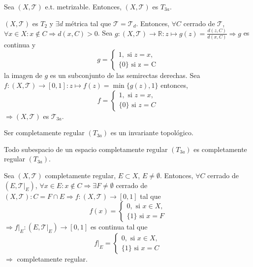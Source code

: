 \begin{prop}
  Sea $( X, \mathcal{T} )$ e.t. metrizable. Entonces, $( X, \mathcal{T} )$ es $T_{3a}$.
\end{prop}

\begin{dem}
  $( X, \mathcal{T} )$ es $T_{2}$ y $\exists d$ métrica tal que $\mathcal{T} = \mathcal{T}_{d}$. Entonces, $\forall C $ cerrado de $\mathcal{T}$, $\forall x \in X: x \not \in C \Rightarrow d(x, C) > 0$. Sea $g: ( X, \mathcal{T} ) \to \mathbb{R}: z \mapsto g(z) = \frac{d(z, C)}{d(x, C)} \Rightarrow g$ es continua y
  \[ 
    g =
    \begin{cases}
      1, \text{ si } z=x,\\
      \{ 0 \} \text{ si z = C}
    \end{cases} 
  \] 
  la imagen de $g$ es un subconjunto de las semirectas derechas. Sea $f: ( X, \mathcal{T} ) \to [0, 1] : z \mapsto f(z) = \min \{  g(z), 1 \}$ entonces,
  \[ 
    f =
    \begin{cases}
      1, \text{ si } z=x,\\
      \{ 0 \} \text{ si } z = C
    \end{cases} 
  \] 
  $\Rightarrow ( X, \mathcal{T} )$ es $\mathcal{T}_{3a}$.
\end{dem}

\begin{obs}
  Ser completamente regular $(T_{3a})$ es un invariante topológico.
\end{obs}

\begin{prop}
  Todo subespacio de un espacio completamente regular $(T_{3a})$ es completamente regular $(T_{3a})$.
\end{prop}

\begin{dem}
  Sea $( X, \mathcal{T} )$ completamente regular, $E \subset X$, $E \neq \emptyset$. Entonces, $\forall C$ cerrado de $ ( E, \mathcal{T}|_{E})$, $\forall x \in E: x \not \in C \Rightarrow \exists F \neq \emptyset$ cerrado de $( X, \mathcal{T} ): C = F \cap E \Rightarrow f: ( X, \mathcal{T} ) \to [0, 1]$ tal que
  \[ 
    f(x) =
    \begin{cases}
      0, \text{ si } x \in X,\\
      \{ 1 \} \text{ si } x = F
    \end{cases} 
  \] 
  $\Rightarrow f|_{E}: ( E, \mathcal{T}|_{E}) \to [0, 1]$ es continua tal que
  \[ 
    f|_{E} =
    \begin{cases}
      0, \text{ si } x \in X,\\
      \{ 1 \} \text{ si } x = C
    \end{cases} 
  \] 
  $\Rightarrow $ completamente regular.
\end{dem}

